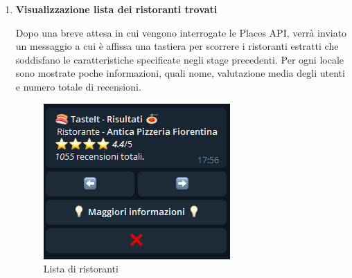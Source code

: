 \documentclass[a4paper, 12pt]{article}
\begin{document}
\begin{enumerate}
		\item \textbf{Visualizzazione lista dei ristoranti trovati}
		
		Dopo una breve attesa in cui vengono interrogate le Places API, verrà inviato un messaggio a cui è affissa una tastiera per scorrere i ristoranti estratti che soddisfano le caratteristiche specificate negli stage precedenti. Per ogni locale sono mostrate poche informazioni, quali nome, valutazione media degli utenti e numero totale di recensioni. 
		
		
		
		\newpage
		\begin{figure}[!htb]
			\begin{minipage}{0.35\textwidth}
				\centering
				\includegraphics[width=\linewidth]{cercaCommand_generalRestaurantInfoList.png}
				\caption{Lista di ristoranti}
			\end{minipage}\hfill
			\begin{minipage}{0.35\textwidth}
				\centering

\end{minipage}
\end{figure}
\end{enumerate}
\end{document}
